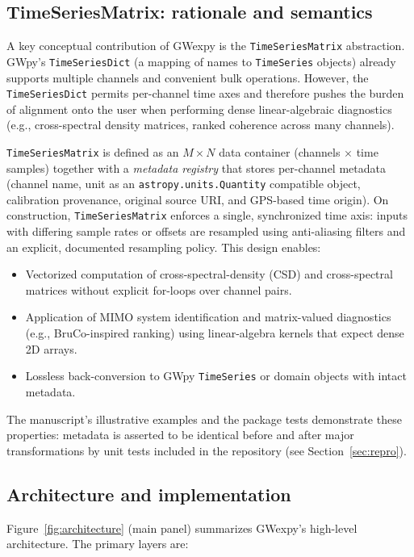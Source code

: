\documentclass[preprint,12pt,a4paper]{elsarticle}
\begin{document}
\subsection{TimeSeriesMatrix: rationale and semantics}
A key conceptual contribution of GWexpy is the \texttt{TimeSeriesMatrix} abstraction.  GWpy's \texttt{TimeSeriesDict} (a mapping of names to \texttt{TimeSeries} objects) already supports multiple channels and convenient bulk operations\cite{gwpy}.  However, the \texttt{TimeSeriesDict} permits per-channel time axes and therefore pushes the burden of alignment onto the user when performing dense linear-algebraic diagnostics (e.g., cross-spectral density matrices, ranked coherence across many channels).

\texttt{TimeSeriesMatrix} is defined as an $M\times N$ data container (channels $\times$ time samples) together with a \emph{metadata registry} that stores per-channel metadata (channel name, unit as an \texttt{astropy.units.Quantity} compatible object, calibration provenance, original source URI, and GPS-based time origin).  On construction, \texttt{TimeSeriesMatrix} enforces a single, synchronized time axis: inputs with differing sample rates or offsets are resampled using anti-aliasing filters and an explicit, documented resampling policy.  This design enables:

\begin{itemize}
  \item Vectorized computation of cross-spectral-density (CSD) and cross-spectral matrices without explicit for-loops over channel pairs.
  \item Application of MIMO system identification and matrix-valued diagnostics (e.g., BruCo-inspired ranking) using linear-algebra kernels that expect dense 2D arrays.
  \item Lossless back-conversion to GWpy \texttt{TimeSeries} or domain objects with intact metadata.
\end{itemize}

The manuscript's illustrative examples and the package tests demonstrate these properties: metadata is asserted to be identical before and after major transformations by unit tests included in the repository (see Section~\ref{sec:repro}).

\subsection{Architecture and implementation}
Figure~\ref{fig:architecture} (main panel) summarizes GWexpy's high-level architecture.  The primary layers are:
\end{document}

